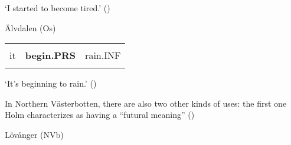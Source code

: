 \begin{styleTranslation}
‘I started to become tired.’ (\citet[19]{Holm1942})

\end{styleTranslation}

\begin{listWWNumileveli}
\item 

\begin{styleExample}
Älvdalen (Os) 

\end{styleExample}

\end{listWWNumileveli}

\begin{tabular}{lll}
\lsptoprule
\multicolumn{3}{l}{E

}\\
it & {\bfseries begin.PRS} & rain.INF\\
\lspbottomrule
\end{tabular}

\begin{styleTranslation}
‘It’s beginning to rain.’ (\citet[115]{Levander1909})

\end{styleTranslation}

\begin{styleBodyTextFirst}
In Northern Västerbotten, there are also two other kinds of uses: the first one Holm characterizes as having a “futural meaning” (\citet[20]{Holm1941})

\end{styleBodyTextFirst}

\begin{listWWNumileveli}
\item 

\begin{styleExample}
\label{bkm:Ref72064267}Lövånger (NVb)

\end{styleExample}

\end{listWWNumileveli}

